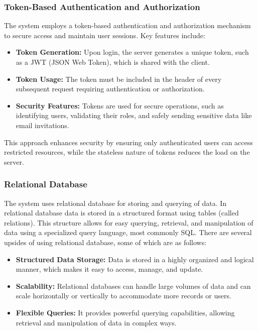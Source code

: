 \subsubsection{Token-Based Authentication and Authorization}
The system employs a token-based authentication and authorization mechanism to secure access and maintain user sessions. Key features include:
\begin{itemize}
    \item \textbf{Token Generation:} Upon login, the server generates a unique token, such as a JWT (JSON Web Token), which is shared with the client.
    \item \textbf{Token Usage:} The token must be included in the header of every subsequent request requiring authentication or authorization.
    \item \textbf{Security Features:} Tokens are used for secure operations, such as identifying users, validating their roles, and safely sending sensitive data like email invitations.
\end{itemize}
This approach enhances security by ensuring only authenticated users can access restricted resources, while the stateless nature of tokens reduces the load on the server.

\subsubsection{Relational Database}
The system uses relational database for storing and querying of data. In relational database data is stored in a structured format using tables (called relations). This structure allows for easy querying, retrieval, and manipulation of data using a specialized query language, most commonly SQL. There are several upsides of using relational database, some of which are as follows:
\begin{itemize}
\item \textbf{Structured Data Storage:} Data is stored in a highly organized and logical manner, which makes it easy to access, manage, and update.
\item \textbf{Scalability:} Relational databases can handle large volumes of data and can scale horizontally or vertically to accommodate more records or users.
\item \textbf{Flexible Queries:} It provides powerful querying capabilities, allowing retrieval and manipulation of data in complex ways. 

\end{itemize}






